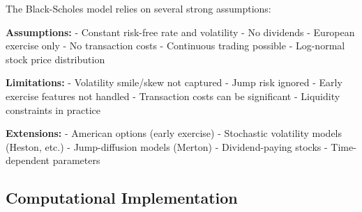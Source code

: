 \documentclass[
  letterpaper,
  DIV=11,
  numbers=noendperiod]{scrartcl}
\begin{document}
\begin{tcolorbox}[enhanced jigsaw, colback=white, rightrule=.15mm, coltitle=black, left=2mm, colframe=quarto-callout-warning-color-frame, breakable, arc=.35mm, bottomtitle=1mm, toptitle=1mm, titlerule=0mm, leftrule=.75mm, colbacktitle=quarto-callout-warning-color!10!white, title={Remark 5.3 (Model Assumptions and Limitations)}, toprule=.15mm, opacitybacktitle=0.6, bottomrule=.15mm, opacityback=0]

The Black-Scholes model relies on several strong assumptions:

\textbf{Assumptions:} - Constant risk-free rate and volatility - No
dividends - European exercise only - No transaction costs - Continuous
trading possible - Log-normal stock price distribution

\textbf{Limitations:} - Volatility smile/skew not captured - Jump risk
ignored - Early exercise features not handled - Transaction costs can be
significant - Liquidity constraints in practice

\textbf{Extensions:} - American options (early exercise) - Stochastic
volatility models (Heston, etc.) - Jump-diffusion models (Merton) -
Dividend-paying stocks - Time-dependent parameters

\end{tcolorbox}

\hypertarget{computational-implementation}{%
\subsection{Computational
Implementation}\label{computational-implementation}}
\end{document}
